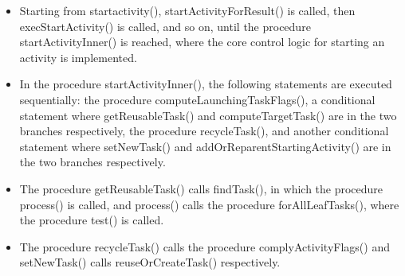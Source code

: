 \begin{itemize}
\item Starting from startactivity(),  startActivityForResult() is called, then execStartActivity() is called, and so on, until the procedure startActivityInner() is reached, where the core control logic for starting an activity is implemented. 
%
\item In the procedure startActivityInner(), the following statements are executed sequentially: the procedure computeLaunchingTaskFlags(), a conditional statement where getReusableTask() and computeTargetTask() are in the two branches respectively, the procedure recycleTask(), and another conditional statement where setNewTask() and addOrReparentStartingActivity() are in the two branches respectively.  
%
\item The procedure getReusableTask() calls findTask(), in which the procedure process() is called, and process() calls the procedure forAllLeafTasks(), where the procedure test() is called. 
%
\item The procedure recycleTask() calls the procedure complyActivityFlags() and setNewTask() calls reuseOrCreateTask() respectively.
\end{itemize}
